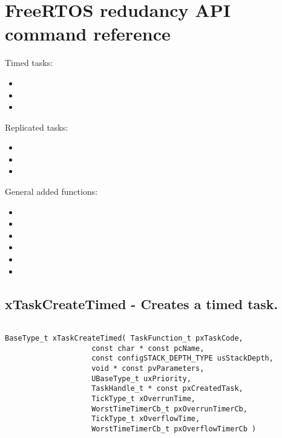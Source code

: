 \chapter{FreeRTOS redudancy API command reference} %
\label{appendix_cmd_ref_freertos}

Timed tasks:
\begin{itemize}

    \item {}
    \item {}
    \item {}
    
\end{itemize}

\noindent Replicated tasks:
\begin{itemize}

    \item {}
    \item {}
    \item {}
    
\end{itemize}

\noindent General added functions:
\begin{itemize}

    \item {}
    \item {}
    \item {}
    \item {}
    \item {}
    \item {}
    
\end{itemize}
\pagebreak
\section{xTaskCreateTimed -  Creates a timed task.}
\label{rt_cmd:xTaskCreateTimed}

\begin{verbatim}

BaseType_t xTaskCreateTimed( TaskFunction_t pxTaskCode,
                    const char * const pcName,
                    const configSTACK_DEPTH_TYPE usStackDepth,
                    void * const pvParameters,
                    UBaseType_t uxPriority,
                    TaskHandle_t * const pxCreatedTask,
                    TickType_t xOverrunTime,
                    WorstTimeTimerCb_t pxOverrunTimerCb,
                    TickType_t xOverflowTime,
                    WorstTimeTimerCb_t pxOverflowTimerCb )
            
\end{verbatim}

